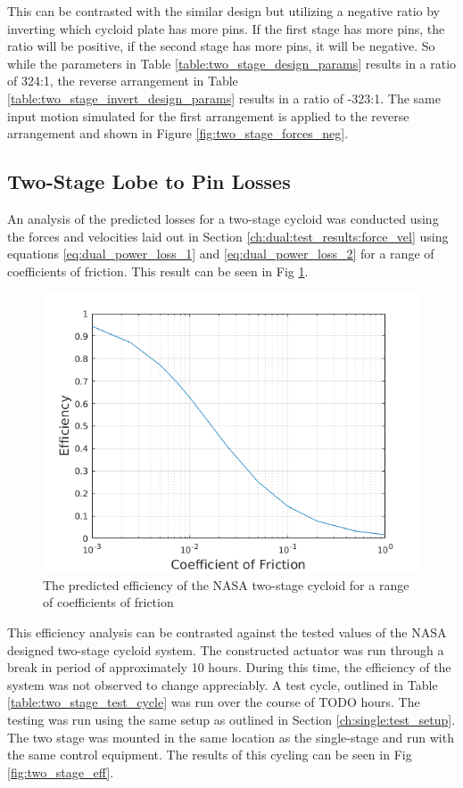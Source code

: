 This can be contrasted with the similar design but utilizing a negative ratio by inverting which cycloid plate has more pins. If the first stage has more pins, the ratio will be positive, if the second stage has more pins, it will be negative. So while the parameters in Table \ref{table:two_stage_design_params} results in a ratio of 324:1, the reverse arrangement in Table \ref{table:two_stage_invert_design_params} results in a ratio of -323:1. The same input motion simulated for the first arrangement is applied to the reverse arrangement and shown in Figure \ref{fig:two_stage_forces_neg}.

\subsection{Two-Stage Lobe to Pin Losses} \label{ch:dual:test_results:losses}

An analysis of the predicted losses for a two-stage cycloid was conducted using the forces and velocities laid out in Section \ref{ch:dual:test_results:force_vel} using equations \ref{eq:dual_power_loss_1} and \ref{eq:dual_power_loss_2} for a range of coefficients of friction. This result can be seen in Fig \ref{fig:two_stage_as_designed}.

\begin{figure}[h]
	\centering
	\includegraphics[width=0.75\linewidth]{fig/two_stage_as_designed}
   \caption{The predicted efficiency of the NASA two-stage cycloid for a range of coefficients of friction}
   \label{fig:two_stage_as_designed}
\end{figure}

This efficiency analysis can be contrasted against the tested values of the NASA designed two-stage cycloid system. The constructed actuator was run through a break in period of approximately 10 hours. During this time, the efficiency of the system was not observed to change appreciably. A test cycle, outlined in Table \ref{table:two_stage_test_cycle} was run over the course of TODO hours. The testing was run using the same setup as outlined in Section \ref{ch:single:test_setup}. The two stage was mounted in the same location as the single-stage and run with the same control equipment. The results of this cycling can be seen in Fig \ref{fig:two_stage_eff}.


